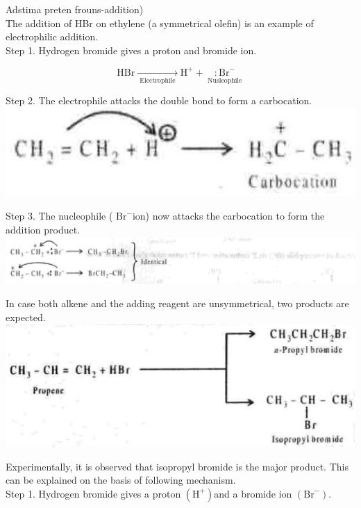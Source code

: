 \documentclass[10pt]{article}
\begin{document}
Adstima preten frouns-addition)\\
The addition of HBr on ethylene (a symmetrical olefin) is an example of electrophilic addition.\\
Step 1. Hydrogen bromide gives a proton and bromide ion.

$$
\mathrm{HBr} \underset{\text { Electrophile }}{\longrightarrow} \mathrm{H}^{+}+\underset{\text { Nusleophile }}{: \mathrm{Br}^{-}}
$$

Step 2. The electrophile attacks the double bond to form a carbocation. $\qquad$\\
\includegraphics[max width=\textwidth, center]{2025_01_28_8470952b98110cec3aabg-095(2)}

Step 3. The nucleophile ( $\mathrm{Br}^{-}$ion) now attacks the carbocation to form the addition product.\\
\includegraphics[max width=\textwidth, center]{2025_01_28_8470952b98110cec3aabg-095(6)}

In case both alkene and the adding reagent are unsymmetrical, two products are expected.\\
\includegraphics[max width=\textwidth, center]{2025_01_28_8470952b98110cec3aabg-096(4)}

Experimentally, it is observed that isopropyl bromide is the major product. This can be explained on the basis of following mechanism.\\
Step 1. Hydrogen bromide gives a proton $\left(\mathrm{H}^{+}\right)$and a bromide ion $\left(\mathrm{Br}^{-}\right)$.
\end{document}
